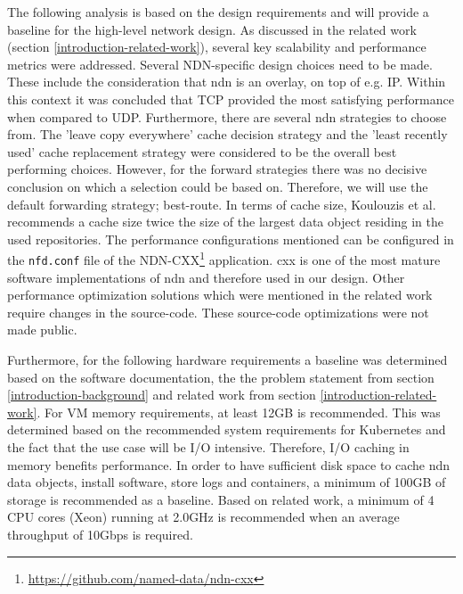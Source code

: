 The following analysis is based on the design requirements and will provide a baseline for the high-level network design. As discussed in the related work (section \ref{introduction-related-work}), several key scalability and performance metrics were addressed. Several NDN-specific design choices need to be made. These include the consideration that \gls{ndn} is an overlay, on top of e.g. IP. Within this context it was concluded that TCP provided the most satisfying performance when compared to UDP. Furthermore, there are several \gls{ndn} strategies to choose from. The 'leave copy everywhere' cache decision strategy and the 'least recently used' cache replacement strategy were considered to be the overall best performing choices. However, for the forward strategies there was no decisive conclusion on which a selection could be based on. Therefore, we will use the default forwarding strategy; best-route. In terms of cache size, Koulouzis et al. recommends a cache size twice the size of the largest data object residing in the used repositories. The performance configurations mentioned can be configured in the \texttt{nfd.conf} file of the NDN-CXX\footnote{\url{https://github.com/named-data/ndn-cxx}} application. \gls{cxx} is one of the most mature software implementations of \gls{ndn} and therefore used in our design. Other performance optimization solutions which were mentioned in the related work require changes in the source-code. These source-code optimizations were not made public.

Furthermore, for the following hardware requirements a baseline was determined based on the software documentation, the the problem statement from section \ref{introduction-background} and related work from section \ref{introduction-related-work}. For VM memory requirements, at least 12GB is recommended. This was determined based on the recommended system requirements for Kubernetes \cite{kubernetes-system-requirements} and the fact that the use case will be I/O intensive. Therefore, I/O caching in memory benefits performance. In order to have sufficient disk space to cache \gls{ndn} data objects, install software, store logs and containers, a minimum of 100GB of storage is recommended as a baseline. Based on related work, a minimum of 4 CPU cores (Xeon) running at 2.0GHz is recommended when an average throughput of 10Gbps is required.

%

